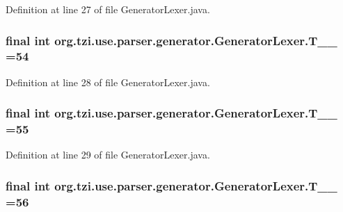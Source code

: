 Definition at line 27 of file Generator\-Lexer.\-java.

\hypertarget{classorg_1_1tzi_1_1use_1_1parser_1_1generator_1_1_generator_lexer_a95352817d68456e1d39d05d592671ba5}{
\subsubsection[{T\-\_\-\-\_\-54}]{\setlength{\rightskip}{0pt plus 5cm}final int org.\-tzi.\-use.\-parser.\-generator.\-Generator\-Lexer.\-T\-\_\-\-\_ =54\hspace{0.3cm}{\ttfamily [static]}}}\label{classorg_1_1tzi_1_1use_1_1parser_1_1generator_1_1_generator_lexer_a95352817d68456e1d39d05d592671ba5}


Definition at line 28 of file Generator\-Lexer.\-java.

\hypertarget{classorg_1_1tzi_1_1use_1_1parser_1_1generator_1_1_generator_lexer_a7806fb9fa4ab21d602ca85e4da004ac6}{
\subsubsection[{T\-\_\-\-\_\-55}]{\setlength{\rightskip}{0pt plus 5cm}final int org.\-tzi.\-use.\-parser.\-generator.\-Generator\-Lexer.\-T\-\_\-\-\_ =55\hspace{0.3cm}{\ttfamily [static]}}}\label{classorg_1_1tzi_1_1use_1_1parser_1_1generator_1_1_generator_lexer_a7806fb9fa4ab21d602ca85e4da004ac6}


Definition at line 29 of file Generator\-Lexer.\-java.

\hypertarget{classorg_1_1tzi_1_1use_1_1parser_1_1generator_1_1_generator_lexer_a9a53e355e1ac40b80bd082b8a39dffda}{
\subsubsection[{T\-\_\-\-\_\-56}]{\setlength{\rightskip}{0pt plus 5cm}final int org.\-tzi.\-use.\-parser.\-generator.\-Generator\-Lexer.\-T\-\_\-\-\_ =56\hspace{0.3cm}{\ttfamily [static]}}}\label{classorg_1_1tzi_1_1use_1_1parser_1_1generator_1_1_generator_lexer_a9a53e355e1ac40b80bd082b8a39dffda}


